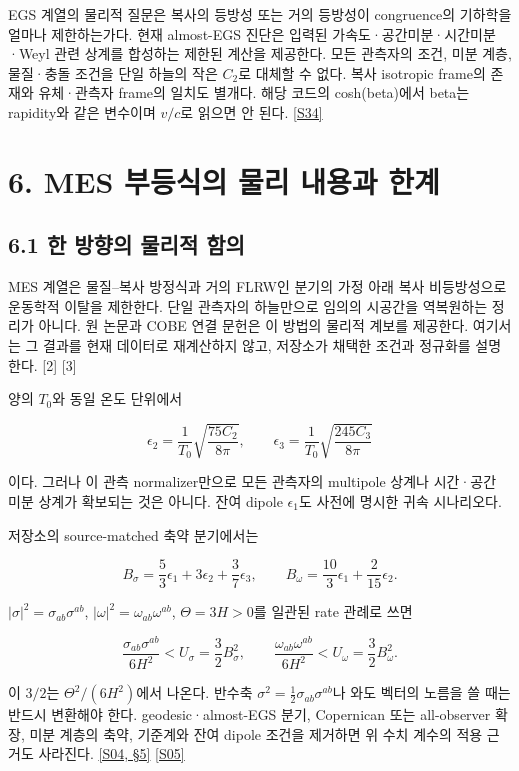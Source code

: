 \documentclass[11pt,a4paper]{article}
\begin{document}
EGS 계열의 물리적 질문은 복사의 등방성 또는 거의 등방성이 congruence의 기하학을 얼마나 제한하는가다. 현재 almost-EGS 진단은 입력된 가속도·공간미분·시간미분·Weyl 관련 상계를 합성하는 제한된 계산을 제공한다. 모든 관측자의 조건, 미분 계층, 물질·충돌 조건을 단일 하늘의 작은 \(C_2\)로 대체할 수 없다. 복사 isotropic frame의 존재와 유체·관측자 frame의 일치도 별개다. 해당 코드의 cosh(beta)에서 beta는 rapidity와 같은 변수이며 \(v/c\)로 읽으면 안 된다. \hyperlink{src:S34}{[S34]}


\hypertarget{s6}{}

\section*{6. MES 부등식의 물리 내용과 한계}


\subsection*{6.1 한 방향의 물리적 함의}

MES 계열은 물질–복사 방정식과 거의 FLRW인 분기의 가정 아래 복사 비등방성으로 운동학적 이탈을 제한한다. 단일 관측자의 하늘만으로 임의의 시공간을 역복원하는 정리가 아니다. 원 논문과 COBE 연결 문헌은 이 방법의 물리적 계보를 제공한다. 여기서는 그 결과를 현재 데이터로 재계산하지 않고, 저장소가 채택한 조건과 정규화를 설명한다. [2] [3]


양의 \(T_0\)와 동일 온도 단위에서


\[
\epsilon_2=\frac1{T_0}\sqrt{\frac{75C_2}{8\pi}},\qquad
\epsilon_3=\frac1{T_0}\sqrt{\frac{245C_3}{8\pi}}
\]

이다. 그러나 이 관측 normalizer만으로 모든 관측자의 multipole 상계나 시간·공간 미분 상계가 확보되는 것은 아니다. 잔여 dipole \(\epsilon_1\)도 사전에 명시한 귀속 시나리오다.


저장소의 source-matched 축약 분기에서는


\[
B_\sigma=\frac53\epsilon_1+3\epsilon_2+\frac37\epsilon_3,
\qquad
B_\omega=\frac{10}{3}\epsilon_1+\frac{2}{15}\epsilon_2.
\]

\(|\sigma|^2=\sigma_{ab}\sigma^{ab}\), \(|\omega|^2=\omega_{ab}\omega^{ab}\), \(\Theta=3H>0\)를 일관된 rate 관례로 쓰면


\[
\frac{\sigma_{ab}\sigma^{ab}}{6H^2}<U_\sigma=\frac32B_\sigma^2,
\qquad
\frac{\omega_{ab}\omega^{ab}}{6H^2}<U_\omega=\frac32B_\omega^2.
\]

이 \(3/2\)는 \(\Theta^2/(6H^2)\)에서 나온다. 반수축 \(\sigma^2=\tfrac12\sigma_{ab}\sigma^{ab}\)나 와도 벡터의 노름을 쓸 때는 반드시 변환해야 한다. geodesic·almost-EGS 분기, Copernican 또는 all-observer 확장, 미분 계층의 축약, 기준계와 잔여 dipole 조건을 제거하면 위 수치 계수의 적용 근거도 사라진다. \hyperlink{src:S04}{[S04, §5]} \hyperlink{src:S05}{[S05]}
\end{document}
